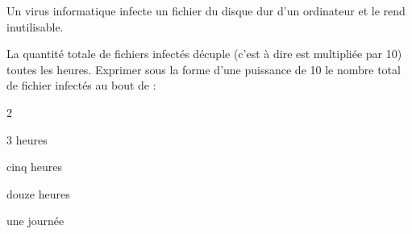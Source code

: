 \documentclass[exercice]{thedocument}%
\begin{document}
%
\begin{flushleft}
    Un virus informatique infecte un fichier du disque dur d'un ordinateur
    et le rend inutilisable.\par La quantité totale de fichiers infectés
    décuple (c'est à dire est multipliée par 10) toutes les heures.
    Exprimer sous la forme d'une puissance de 10 le nombre total de fichier
    infectés au bout de :
\end{flushleft}
\begin{enumerate}
    \begin{multicols}{2}
        \item 3 heures
        \item cinq heures
        \item douze heures
        \item une journée
    \end{multicols}
\end{enumerate}
\end{document}
